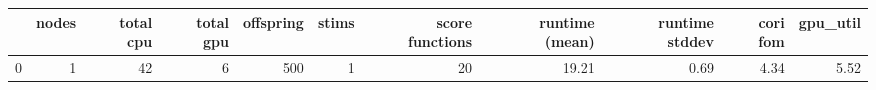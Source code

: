 \begin{tabular}{lrrrrrrrrrr}
\toprule
{} &  nodes &  total cpu &  total gpu &  offspring &  stims &  score functions & runtime (mean) & runtime stddev & cori fom & gpu\_util \\
\midrule
0 &      1 &         42 &          6 &        500 &      1 &               20 &          19.21 &           0.69 &     4.34 &     5.52 \\
\bottomrule
\end{tabular}
